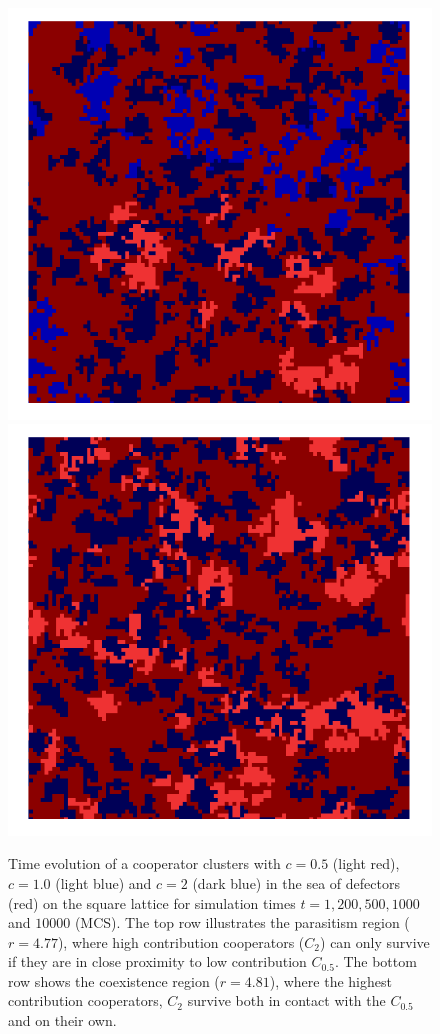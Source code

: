 \documentclass[twocolumn,aps,amsmath,pre,floatfix,superscriptaddress]{revtex4-2}
\begin{document}
\begin{figure}[t!]
\begin{center}
\includegraphics[width=.4\columnwidth]{snapshot1_MCS1000-eps-converted-to.pdf}
\includegraphics[width=.4\columnwidth]{snapshot1_MCS10000-eps-converted-to.pdf}

    \caption{Time evolution of a cooperator clusters with $c=0.5$ (light red), $c=1.0$ (light blue) and $c=2$ (dark blue) in the sea of defectors (red) on the square lattice for simulation times $t = 1, 200, 500, 1000$ and $10000$ (MCS). The top row illustrates the parasitism region ($r=4.77$),  where high contribution cooperators ($C_2$) can only survive if they are in close proximity to low contribution $C_{0.5}$.  The bottom row shows the coexistence region ($r=4.81$), where the highest contribution cooperators, $C_{2}$ survive both in contact with the $C_{0.5}$ and on their own. 
    }
    \label{corte2}
    \end{center}
\end{figure}
\end{document}
